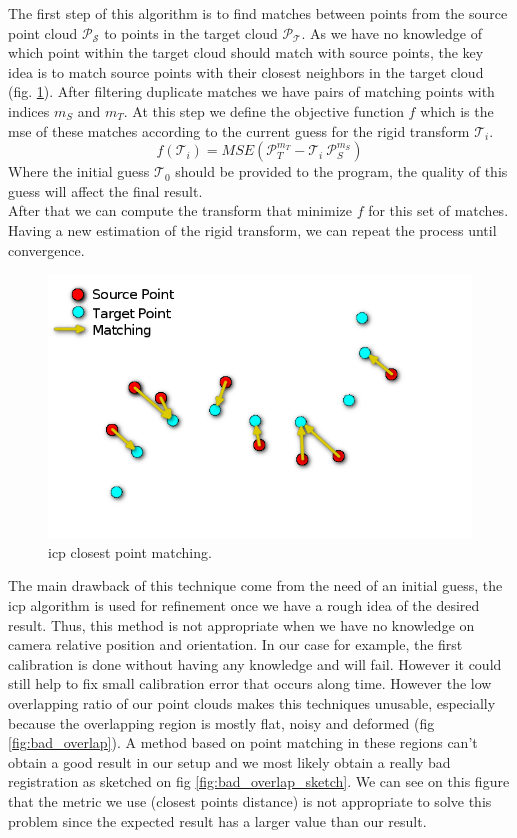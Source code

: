 The first step of this algorithm is to find matches between points from the source point cloud $\mathcal{P_S}$ to points in the target cloud $\mathcal{P_T}$. As we have no knowledge of which point within the target cloud should match with source points, the key idea is to match source points with their closest neighbors in the target cloud (fig. \ref{fig:closest_point}). After filtering duplicate matches we have pairs of matching points with indices $m_S$ and $m_T$. At this step we define the objective function $f$ which is the \acrfull{mse} of these matches according to the current guess for the rigid transform $\mathcal{T}_{i}$. \\
\[
    f(\mathcal{T}_i) = MSE(\mathcal{P}_T^{m_T} - \mathcal{T}_i\: \mathcal{P}_S^{m_S})
\]
Where the initial guess $\mathcal{T}_0$ should be provided to the program, the quality of this guess will affect the final result. \\
After that we can compute the transform that minimize $f$ for this set of matches. Having a new estimation of the rigid transform, we can repeat the process until convergence. 

\begin{figure}[h!]
    \centering
    \includegraphics[width=\textwidth]{images/closest_point.png}
    \caption{\acrshort{icp} closest point matching.}
    \label{fig:closest_point}
\end{figure}

The main drawback of this technique come from the need of an initial guess, the \acrshort{icp} algorithm is used for refinement once we have a rough idea of the desired result. Thus, this method is not appropriate when we have no knowledge on camera relative position and orientation. In our case for example, the first calibration is done without having any knowledge and will fail. However it could still help to fix small calibration error that occurs along time. However the low overlapping ratio of our point clouds makes this techniques unusable, especially because the overlapping region is mostly flat, noisy and deformed (fig \ref{fig:bad_overlap}). A method based on point matching in these regions can't obtain a good result in our setup and we most likely obtain a really bad registration as sketched on fig \ref{fig:bad_overlap_sketch}. We can see on this figure that the metric we use (closest points distance) is not appropriate to solve this problem since the expected result has a larger value than our result. \\

